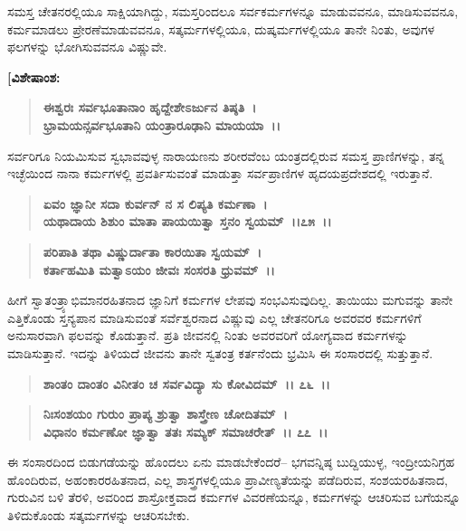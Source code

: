 ಸಮಸ್ತ ಚೇತನರಲ್ಲಿಯೂ ಸಾಕ್ಷಿಯಾಗಿದ್ದು, ಸಮಸ್ತರಿಂದಲೂ ಸರ್ವಕರ್ಮಗಳನ್ನೂ ಮಾಡುವವನೂ, ಮಾಡಿಸುವವನೂ, ಕರ್ಮಮಾಡಲು ಪ್ರೇರಣೆಮಾಡುವವನೂ, ಸತ್ಕರ್ಮಗಳಲ್ಲಿಯೂ, ದುಷ್ಕರ್ಮಗಳಲ್ಲಿಯೂ ತಾನೇ ನಿಂತು, ಅವುಗಳ ಫಲಗಳನ್ನು ಭೋಗಿಸುವವನೂ ವಿಷ್ಣುವೇ.

\begin{flushleft}
\textbf{[ವಿಶೇಷಾಂಶ:} 
\end{flushleft}

\begin{verse}
\textbf{ಈಶ್ವರಃ ಸರ್ವಭೂತಾನಾಂ ಹೃದ್ದೇಶೇಽರ್ಜುನ ತಿಷ್ಠತಿ~।}\\\textbf{ಭ್ರಾಮಯನ್ಸರ್ವಭೂತಾನಿ ಯಂತ್ರಾರೂಢಾನಿ ಮಾಯಯಾ~।।} 
\end{verse}

ಸರ್ವರಿಗೂ ನಿಯಮಿಸುವ ಸ್ವಭಾವವುಳ್ಳ ನಾರಾಯಣನು ಶರೀರವೆಂಬ ಯಂತ್ರದಲ್ಲಿರುವ ಸಮಸ್ತ ಪ್ರಾಣಿಗಳನ್ನು, ತನ್ನ ಇಚ್ಛೆಯಿಂದ ನಾನಾ ಕರ್ಮಗಳಲ್ಲಿ ಪ್ರವರ್ತಿಸುವಂತೆ ಮಾಡುತ್ತಾ ಸರ್ವಪ್ರಾಣಿಗಳ ಹೃದಯಪ್ರದೇಶದಲ್ಲಿ ಇರುತ್ತಾನೆ.

\begin{verse}
\textbf{ಏವಂ ಜ್ಞಾನೀ ಸದಾ ಕುರ್ವನ್ ನ ಸ ಲಿಪ್ಯತಿ ಕರ್ಮಣಾ~।}\\\textbf{ಯಥಾದಾಯ ಶಿಶುಂ ಮಾತಾ ಪಾಯಯಿತ್ವಾ ಸ್ತನಂ ಸ್ವಯಮ್~।।೭೫~।। }
\end{verse}

\begin{verse}
\textbf{ಪರಿಪಾತಿ ತಥಾ ವಿಷ್ಣುರ್ದಾತಾ ಕಾರಯಿತಾ ಸ್ವಯಮ್~।}\\\textbf{ಕರ್ತಾಹಮಿತಿ ಮತ್ವಾಽಯಂ ಜೀವಃ ಸಂಸರತಿ ಧ್ರುವಮ್~।।}
\end{verse}

ಹೀಗೆ ಸ್ವಾತಂತ್ರ್ಯಾಭಿಮಾನರಹಿತನಾದ ಜ್ಞಾನಿಗೆ ಕರ್ಮಗಳ ಲೇಪವು ಸಂಭವಿಸುವುದಿಲ್ಲ. ತಾಯಿಯು ಮಗುವನ್ನು ತಾನೇ ಎತ್ತಿಕೊಂಡು ಸ್ತನ್ಯಪಾನ ಮಾಡಿಸುವಂತೆ ಸರ್ವೆಶ್ವರನಾದ ವಿಷ್ಣುವು ಎಲ್ಲ ಚೇತನರಿಗೂ ಅವರವರ ಕರ್ಮಗಳಿಗೆ ಅನುಸಾರವಾಗಿ ಫಲವನ್ನು ಕೊಡುತ್ತಾನೆ. ಪ್ರತಿ ಜೀವನಲ್ಲಿ ನಿಂತು ಅವರವರಿಗೆ ಯೋಗ್ಯವಾದ ಕರ್ಮಗಳನ್ನು ಮಾಡಿಸುತ್ತಾನೆ. ಇದನ್ನು ತಿಳಿಯದೆ ಜೀವನು ತಾನೇ ಸ್ವತಂತ್ರ ಕರ್ತನೆಂದು ಭ್ರಮಿಸಿ ಈ ಸಂಸಾರದಲ್ಲಿ ಸುತ್ತುತ್ತಾನೆ.

\begin{verse}
\textbf{ಶಾಂತಂ ದಾಂತಂ ವಿನೀತಂ ಚ ಸರ್ವವಿದ್ಯಾ ಸು ಕೋವಿದಮ್~।। ೭೬~।।} 
\end{verse}

\begin{verse}
\textbf{ನಿಃಸಂಶಯಂ ಗುರುಂ ಪ್ರಾಪ್ಯ ಶ್ರುತ್ವಾ ಶಾಸ್ತ್ರೇಣ ಚೋದಿತಮ್~।}\\\textbf{ವಿಧಾನಂ ಕರ್ಮಣೋ ಜ್ಞಾತ್ವಾ ತತಃ ಸಮ್ಯಕ್ ಸಮಾಚರೇತ್~।। ೭೭~।।}
\end{verse}

ಈ ಸಂಸಾರದಿಂದ ಬಿಡುಗಡೆಯನ್ನು ಹೊಂದಲು ಏನು ಮಾಡಬೇಕೆಂದರೆ– ಭಗವನ್ನಿಷ್ಠ ಬುದ್ದಿಯುಳ್ಳ, ಇಂದ್ರೀಯನಿಗ್ರಹ ಹೊಂದಿರುವ, ಅಹಂಕಾರರಹಿತನಾದ, ಎಲ್ಲ ಶಾಸ್ತ್ರಗಳಲ್ಲಿಯೂ ಪ್ರಾವೀಣ್ಯತೆಯನ್ನು ಪಡೆದಿರುವ, ಸಂಶಯರಹಿತನಾದ, ಗುರುವಿನ ಬಳಿ ತೆರಳಿ, ಅವರಿಂದ ಶಾಸ್ರೋಕ್ತವಾದ ಕರ್ಮಗಳ ವಿವರಣೆಯನ್ನೂ, ಕರ್ಮಗಳನ್ನು ಆಚರಿಸುವ ಬಗೆಯನ್ನೂ ತಿಳಿದುಕೊಂಡು ಸತ್ಕರ್ಮಗಳನ್ನು ಆಚರಿಸಬೇಕು.

